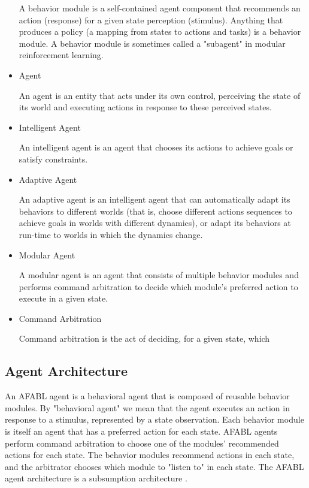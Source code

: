 \begin{itemize}
  A behavior module is a self-contained agent component that recommends an action (response) for a given state perception (stimulus).  Anything that produces a policy (a mapping from states to actions and tasks) is a behavior module.  A behavior module is sometimes called a "subagent" in modular reinforcement learning.

\item Agent

  An agent is an entity that acts under its own control, perceiving the state of its world and executing actions in response to these perceived states.

\item Intelligent Agent

  An intelligent agent is an agent that chooses its actions to achieve goals or satisfy constraints.

\item Adaptive Agent

  An adaptive agent is an intelligent agent that can automatically adapt its behaviors to different worlds (that is, choose different actions sequences to achieve goals in worlds with different dynamics), or adapt its behaviors at run-time to worlds in which the dynamics change.

\item Modular Agent

  A modular agent is an agent that consists of multiple behavior modules and performs command arbitration to decide which module's preferred action to execute in a given state.

\item Command Arbitration

  Command arbitration is the act of deciding, for a given state, which


\end{itemize}

\subsection{Agent Architecture}

An AFABL agent is a behavioral agent that is composed of reusable behavior modules.  By "behavioral agent" we mean that the agent executes an action in response to a stimulus, represented by a state observation.  Each behavior module is itself an agent that has a preferred action for each state.  AFABL agents perform command arbitration to choose one of the modules' recommended actions for each state.  The behavior modules recommend actions in each state, and the arbitrator chooses which module to "listen to" in each state.  The AFABL agent architecture is a subsumption architecture \cite{brooks1986a-robust}.

